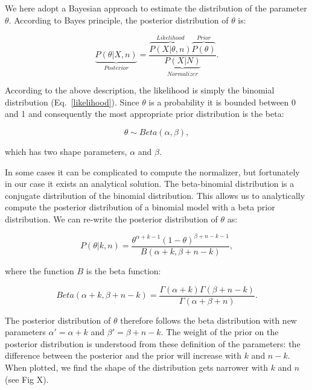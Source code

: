 \documentclass[12pt]{article}
\begin{document}
  We here adopt a Bayesian approach to estimate the distribution of the parameter $\theta$. According to Bayes principle, the posterior distribution of $\theta$ is:

  \begin{equation}
    \underbrace{P(\theta|X,n)}_{Posterior} = \frac{\overbrace{P(X|\theta,n)}^{Likelihood}\overbrace{P(\theta)}^{Prior}}{\underbrace{P(X|N)}_{Normalizer}} .
    \label{posterior}
  \end{equation}

  According to the above description, the likelihood is simply the binomial distribution (Eq.~\ref{likelihood}). Since $\theta$ is a probability it is bounded between 0 and 1 and consequently the most appropriate prior distribution is the beta:

    \begin{equation}
      \theta \sim Beta(\alpha,\beta) , \label{prior}
    \end{equation}

  \noindent which has two shape parameters, $\alpha$ and $\beta$. 

 In some cases it can be complicated to compute the normalizer, but fortunately in our case it exists an analytical solution. The beta-binomial distribution is a conjugate distribution of the binomial distribution. This allows us to analytically compute the posterior distribution of a binomial model with a beta prior distribution. We can re-write the posterior distribution of $\theta$ as:

  \begin{equation}
    P(\theta|k,n) = \frac{\theta^{\alpha+k-1}(1-\theta)^{\beta+n-k-1}}{B(\alpha+k,\beta+n-k)} , \label{posterior}
  \end{equation}

  \noindent where the function $B$ is the beta function:

  \begin{equation}
    Beta(\alpha+k,\beta+n-k) = \frac{\Gamma(\alpha+k)\Gamma(\beta+n-k)}{\Gamma(\alpha+\beta+n)} . \label{betafunction}
  \end{equation}

  The posterior distribution of $\theta$ therefore follows the beta distribution with new parameters $\alpha'= \alpha+k$ and $\beta'=\beta+n-k$. The weight of the prior on the posterior distribution is understood from these definition of the parameters: the difference between the posterior and the prior will increase with $k$ and $n-k$. When plotted, we find the shape of the distribution gets narrower with $k$ and $n$ (see Fig X). 
%
%
%
\end{document}

